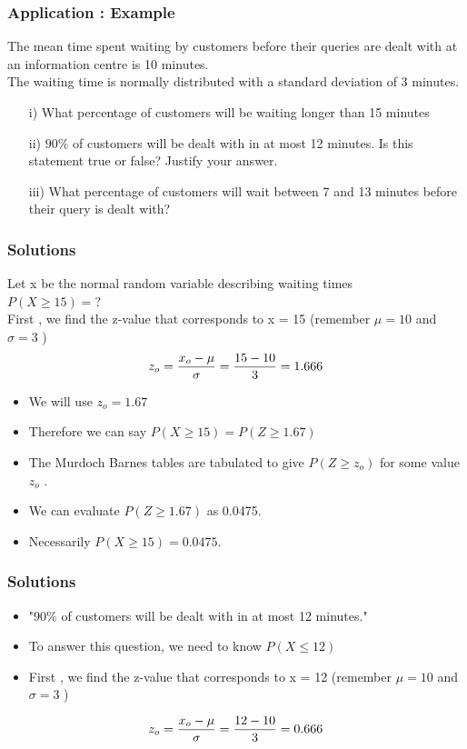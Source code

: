 \documentclass[a4]{beamer}
\begin{document}
\begin{frame}
\frametitle{Application : Example }
The mean time spent waiting by customers before their queries are dealt with at an information centre is 10 minutes.\\ \smallskip
The waiting time is normally distributed with a standard deviation of 3 minutes.
\begin{itemize}
\item [i)] What percentage of customers will be waiting longer than 15 minutes

\item [ii)] $90\%$ of customers will be dealt with in at most 12 minutes. Is this statement true or false?
Justify your answer.

\item [iii)] What percentage of customers will wait between 7 and 13 minutes before their query is dealt with?
\end{itemize}
\end{frame}
\begin{frame}
\frametitle{Solutions}

Let x be the normal random variable describing waiting times\\
$P(X \geq 15) =?$ \\
\bigskip
     First , we find the z-value that corresponds to x = 15  (remember $\mu=10$ and $\sigma=3$  )\\
\[ z_o = { x_o - \mu \over \sigma }  = { 15 - 10 \over 3 } = 1.666 \]
\begin{itemize}
\item We will use $z_o =1.67$
\item Therefore we can say $P(X \geq 15 ) = P(Z \geq 1.67)$
\item The Murdoch Barnes tables are tabulated to give $P(Z \geq z_o)$ for some value $ z_o$ .
\item We can evaluate $P(Z \geq 1.67)$  as 0.0475.
\item Necessarily $P(X \geq 15) = 0.0475$.
\end{itemize}
\end{frame}

\begin{frame}
\frametitle{Solutions}
\begin{itemize}
\item "$90\%$ of customers will be dealt with in at most 12 minutes."
\item To answer this question, we need to know  $P(X\leq 12)$
\item First , we find the z-value that corresponds to x = 12  (remember $\mu=10$ and $\sigma=3$ )
\end{itemize}
\[ z_o = { x_o - \mu \over \sigma }  = { 12 - 10 \over 3 } = 0.666 \]

\end{frame}
\end{document}
